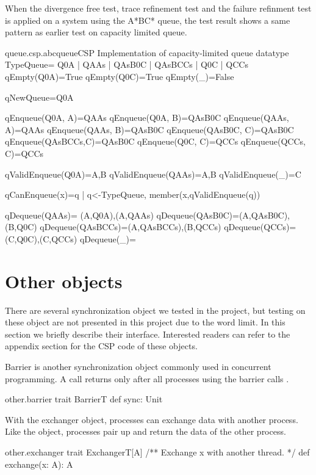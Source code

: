 \documentclass[a4paper, 12pt]{article}
\begin{document}
When the divergence free test, trace refinement test and the failure refinment test is applied on a system using the A*BC* queue, the test result shows a same pattern as earlier test on capacity limited queue. 
\begin{cspfloat}{queue.csp.abcqueue}{CSP Implementation of capacity-limited queue}
datatype TypeQueue= Q0A | QAAs | QAsB0C | QAsBCCs | Q0C  | QCCs
qEmpty(Q0A)=True
qEmpty(Q0C)=True
qEmpty(_)=False

qNewQueue=Q0A

qEnqueue(Q0A,    A)=QAAs
qEnqueue(Q0A,    B)=QAsB0C
qEnqueue(QAAs,   A)=QAAs
qEnqueue(QAAs,   B)=QAsB0C
qEnqueue(QAsB0C, C)=QAsB0C
qEnqueue(QAsBCCs,C)=QAsB0C
qEnqueue(Q0C,    C)=QCCs
qEnqueue(QCCs,   C)=QCCs

qValidEnqueue(Q0A)={A,B}
qValidEnqueue(QAAs)={A,B}
qValidEnqueue(_)={C}

qCanEnqueue(x)={q | q<-TypeQueue, member(x,qValidEnqueue(q))}

qDequeue(QAAs)=  {(A,Q0A),(A,QAAs)}
qDequeue(QAsB0C)={(A,QAsB0C),(B,Q0C)}
qDequeue(QAsBCCs)={(A,QAsBCCs),(B,QCCs)}
qDequeue(QCCs)={(C,Q0C),(C,QCCs)}
qDequeue(_)={}
\end{cspfloat}

\newpage
\section{Other objects}
There are several synchronization object we tested in the project, but testing on these object are not presented in this project due to the word limit. In this section we briefly describe their interface. Interested readers can refer to the appendix section for the CSP code of these objects.

Barrier is another synchronization object commonly used in concurrent programming. A  call returns only after all processes using the barrier calls . 
\begin{scalafloat}{other.barrier}{}
trait BarrierT{
  def sync: Unit
}    
\end{scalafloat}

With the exchanger object, processes can exchange data with another process. Like the  object, processes pair up and return the data of the other process.
\begin{scalafloat}{other.exchanger}{}
trait ExchangerT[A]{
  /** Exchange x with another thread. */
  def exchange(x: A): A
}
\end{scalafloat}
\end{document}
